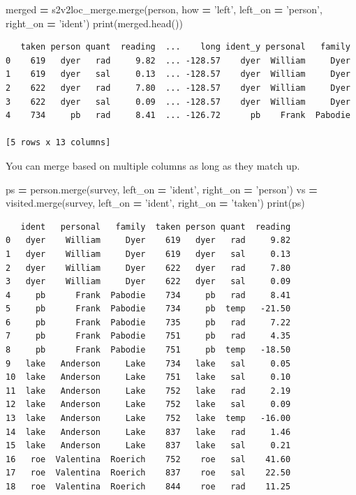 \documentclass[
  letterpaper,
]{scrbook}
\newenvironment{Shaded}{\begin{snugshade}}{\end{snugshade}}
\newcommand{\BuiltInTok}[1]{#1}
\newcommand{\NormalTok}[1]{#1}
\newcommand{\OperatorTok}[1]{\textcolor[rgb]{0.81,0.36,0.00}{\textbf{#1}}}
\newcommand{\StringTok}[1]{\textcolor[rgb]{0.31,0.60,0.02}{#1}}
\begin{document}
\begin{Shaded}
\begin{Highlighting}[]
\NormalTok{merged }\OperatorTok{=}\NormalTok{ s2v2loc_merge.merge(person, how }\OperatorTok{=} \StringTok{'left'}\NormalTok{, left_on }\OperatorTok{=} \StringTok{'person'}\NormalTok{, right_on }\OperatorTok{=} \StringTok{'ident'}\NormalTok{)}
\BuiltInTok{print}\NormalTok{(merged.head())}
\end{Highlighting}
\end{Shaded}

\begin{verbatim}
   taken person quant  reading  ...    long ident_y personal   family
0    619   dyer   rad     9.82  ... -128.57    dyer  William     Dyer
1    619   dyer   sal     0.13  ... -128.57    dyer  William     Dyer
2    622   dyer   rad     7.80  ... -128.57    dyer  William     Dyer
3    622   dyer   sal     0.09  ... -128.57    dyer  William     Dyer
4    734     pb   rad     8.41  ... -126.72      pb    Frank  Pabodie

[5 rows x 13 columns]
\end{verbatim}

You can merge based on multiple columns as long as they match up.

\begin{Shaded}
\begin{Highlighting}[]
\NormalTok{ps }\OperatorTok{=}\NormalTok{ person.merge(survey, left_on }\OperatorTok{=} \StringTok{'ident'}\NormalTok{, right_on }\OperatorTok{=} \StringTok{'person'}\NormalTok{)}
\NormalTok{vs }\OperatorTok{=}\NormalTok{ visited.merge(survey, left_on }\OperatorTok{=} \StringTok{'ident'}\NormalTok{, right_on }\OperatorTok{=} \StringTok{'taken'}\NormalTok{)}
\BuiltInTok{print}\NormalTok{(ps)}
\end{Highlighting}
\end{Shaded}

\begin{verbatim}
   ident   personal   family  taken person quant  reading
0   dyer    William     Dyer    619   dyer   rad     9.82
1   dyer    William     Dyer    619   dyer   sal     0.13
2   dyer    William     Dyer    622   dyer   rad     7.80
3   dyer    William     Dyer    622   dyer   sal     0.09
4     pb      Frank  Pabodie    734     pb   rad     8.41
5     pb      Frank  Pabodie    734     pb  temp   -21.50
6     pb      Frank  Pabodie    735     pb   rad     7.22
7     pb      Frank  Pabodie    751     pb   rad     4.35
8     pb      Frank  Pabodie    751     pb  temp   -18.50
9   lake   Anderson     Lake    734   lake   sal     0.05
10  lake   Anderson     Lake    751   lake   sal     0.10
11  lake   Anderson     Lake    752   lake   rad     2.19
12  lake   Anderson     Lake    752   lake   sal     0.09
13  lake   Anderson     Lake    752   lake  temp   -16.00
14  lake   Anderson     Lake    837   lake   rad     1.46
15  lake   Anderson     Lake    837   lake   sal     0.21
16   roe  Valentina  Roerich    752    roe   sal    41.60
17   roe  Valentina  Roerich    837    roe   sal    22.50
18   roe  Valentina  Roerich    844    roe   rad    11.25
\end{verbatim}
\end{document}
